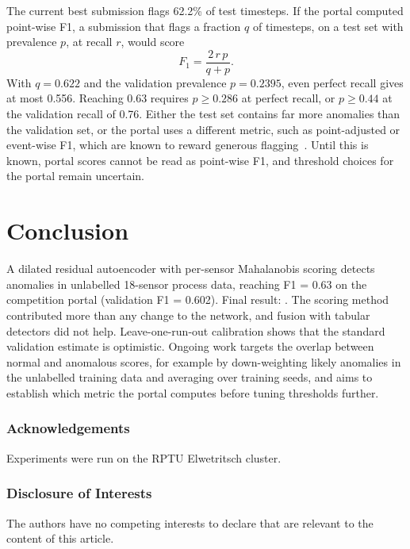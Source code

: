 \documentclass[runningheads]{llncs}
\newcommand{\portalFone}{0.63}
\newcommand{\valFone}{0.602}
\newif\ifshowplaceholders
\newcommand{\placeholder}[1]{\ifshowplaceholders\textcolor{red}{\textbf{[#1]}}\fi}
\newcommand{\finalFone}{\placeholder{FINAL F1 SCORE TO BE UPDATED}}
\providecommand{\ackname}{Acknowledgements}
\providecommand{\discintname}{Disclosure of Interests}
\begin{document}
The current best submission flags 62.2\% of test timesteps. If the portal computed point-wise F1, a submission that flags a fraction $q$ of timesteps, on a test set with prevalence $p$, at recall $r$, would score
\begin{equation}
  F_1 = \frac{2\,r\,p}{q + p}.
\end{equation}
With $q = 0.622$ and the validation prevalence $p = 0.2395$, even perfect recall gives at most 0.556. Reaching \portalFone{} requires $p \geq 0.286$ at perfect recall, or $p \geq 0.44$ at the validation recall of 0.76. Either the test set contains far more anomalies than the validation set, or the portal uses a different metric, such as point-adjusted or event-wise F1, which are known to reward generous flagging~\cite{kim2022towards}. Until this is known, portal scores cannot be read as point-wise F1, and threshold choices for the portal remain uncertain.

\section{Conclusion}

A dilated residual autoencoder with per-sensor Mahalanobis scoring detects anomalies in unlabelled 18-sensor process data, reaching F1 = \portalFone{} on the competition portal (validation F1 = \valFone). Final result: \finalFone. The scoring method contributed more than any change to the network, and fusion with tabular detectors did not help. Leave-one-run-out calibration shows that the standard validation estimate is optimistic. Ongoing work targets the overlap between normal and anomalous scores, for example by down-weighting likely anomalies in the unlabelled training data and averaging over training seeds, and aims to establish which metric the portal computes before tuning thresholds further.

\begin{credits}
\subsubsection{\ackname}
Experiments were run on the RPTU Elwetritsch cluster.

\subsubsection{\discintname}
The authors have no competing interests to declare that are relevant to the content of this article.
\end{credits}



\end{document}
